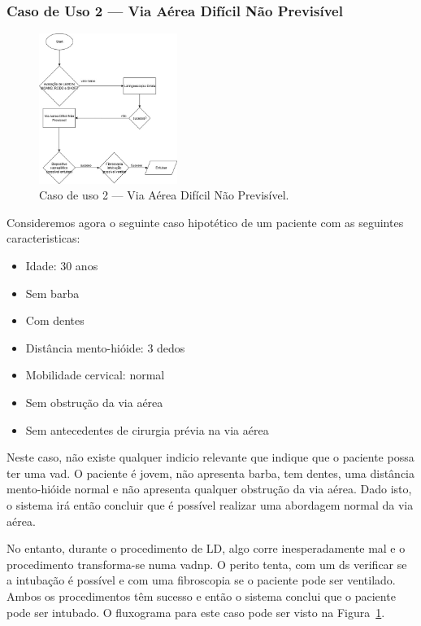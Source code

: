\documentclass[a4paper,12pt,twoside]{article}
\begin{document}
    \subsubsection{Caso de Uso 2 --- Via Aérea Difícil Não Previsível}

    \begin{figure}[H]
        \centering
        \includegraphics[width=0.4\textwidth]{./resources/pdf/casoDeUso2.jpg}
        \caption{Caso de uso 2 --- Via Aérea Difícil Não Previsível.}
        \label{fig:caso2}
    \end{figure}

    Consideremos agora o seguinte caso hipotético de um paciente com as seguintes caracteristicas:
    \begin{itemize}
        \setlength{\itemsep}{2pt} 
        \setlength{\parskip}{0pt} 
        \setlength{\parsep}{0pt} 
        \item Idade: 30 anos
        \item Sem barba
        \item Com dentes
        \item Distância mento-hióide: 3 dedos
        \item Mobilidade cervical: normal
        \item Sem obstrução da via aérea
        \item Sem antecedentes de cirurgia prévia na via aérea
    \end{itemize}

    Neste caso, não existe qualquer indicio relevante que indique que o paciente possa ter uma \gls{vad}. O paciente é jovem, não apresenta barba, tem dentes, uma distância mento-hióide normal e não apresenta qualquer obstrução da via aérea. Dado isto, o sistema irá então concluir que é possível realizar uma abordagem normal da via aérea. 
    
    No entanto, durante o procedimento de \gls{LD}, algo corre inesperadamente mal e o procedimento transforma-se numa \gls{vadnp}. O perito tenta, com um \gls{ds} verificar se a intubação é possível e com uma \gls{fibroscopia} se o paciente pode ser ventilado. Ambos os procedimentos têm sucesso e então o sistema conclui que o paciente pode ser intubado. O fluxograma para este caso pode ser visto na Figura~\ref{fig:caso2}.
\end{document}
